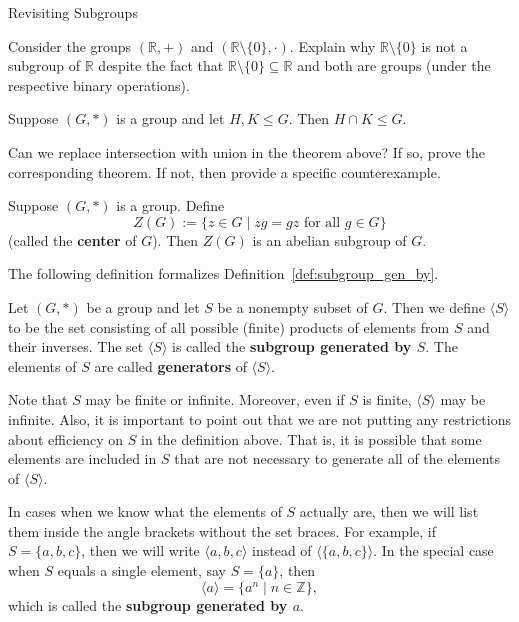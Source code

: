 \begin{section}{Revisiting Subgroups}
\begin{exercise}
Consider the groups $(\mathbb{R},+)$ and $(\mathbb{R}\setminus\{0\},\cdot)$.  Explain why $\mathbb{R}\setminus\{0\}$ is not a subgroup of $\mathbb{R}$ despite the fact that $\mathbb{R}\setminus\{0\}\subseteq\mathbb{R}$ and both are groups (under the respective binary operations).
\end{exercise}

\begin{theorem}
Suppose $(G,*)$ is a group and let $H,K\leq G$.  Then $H\cap K\leq G$.
\end{theorem}

\begin{problem}
Can we replace intersection with union in the theorem above?  If so, prove the corresponding theorem.  If not, then provide a specific counterexample.
\end{problem}

\begin{theorem}
Suppose $(G,*)$ is a group.  Define
\[
Z(G):=\{z\in G\mid zg=gz\text{ for all } g\in G\}
\]
(called the \textbf{center} of $G$).  Then $Z(G)$ is an abelian subgroup of $G$.
\end{theorem}

The following definition formalizes Definition~\ref{def:subgroup_gen_by}.

\begin{definition}
Let $(G,*)$ be a group and let $S$ be a nonempty subset of $G$.  Then we define $\langle S\rangle$ to be the set consisting of all possible (finite) products of elements from $S$ and their inverses.  The set $\langle S\rangle$ is called the \textbf{subgroup generated by $S$}.  The elements of $S$ are called \textbf{generators} of $\langle S\rangle$.
\end{definition}

Note that $S$ may be finite or infinite.  Moreover, even if $S$ is finite, $\langle S\rangle$ may be infinite.  Also, it is important to point out that we are not putting any restrictions about efficiency on $S$ in the definition above.  That is, it is possible that some elements are included in $S$ that are not necessary to generate all of the elements of $\langle S\rangle$.

In cases when we know what the elements of $S$ actually are, then we will list them inside the angle brackets without the set braces.  For example, if $S=\{a,b,c\}$, then we will write $\langle a, b, c\rangle$ instead of $\langle \{a,b,c\}\rangle$.  In the special case when $S$ equals a single element, say $S=\{a\}$, then
\[
\langle a\rangle =\{a^n\mid n\in\mathbb{Z}\},
\]
which is called the \textbf{subgroup generated by $a$}.  


\end{section}
